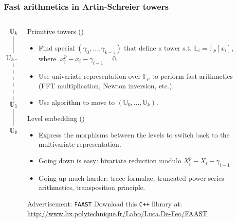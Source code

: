 \documentclass[10pt]{beamer}
\newcommand{\blue}[1]{\textcolor{blue}{#1}}  %
\newcommand{\LK}{\mathbb{L}}  %
\newcommand{\U}{\mathbb{U}}  %
\newcommand{\F}{\mathbb{F}}  %
\newcommand{\0}{\mathcal{O}}  %
\begin{document}
\begin{frame}
  \frametitle{Fast arithmetics in Artin-Schreier towers}

  \begin{columns}
    \begin{column}{0.1\textwidth}
      \Large\[\xymatrix{
        \U_k\ar@{-}[d]\\
        \U_{k-1} \ar@{--}[dd]\\
        \\
        \U_1 \ar@{-}[d]\\
        \U_0
      }\]
    \end{column}
    \begin{column}{0.85\textwidth}
      \vspace{-3mm}
      \begin{block}{Primitive towers (\cite{DFS10})}
        \begin{itemize}
        \item Find special $(\gamma_0,\ldots,\gamma_{k-1})$ that
          define a tower s.t. $\LK_i = \F_p[x_i]$, where
          $\;x_i^p-x_i-\gamma_{i-1}=0$.
        \item Use univariate representation over $\F_p$ to perform
          fast arithmetics (FFT multiplication, Newton inversion,
          etc.).
        \item Use \cite{Couveignes00} algorithm to move to
          $(\U_0,\ldots,\U_k)$.
        \end{itemize}
      \end{block}
      
      \vspace{-3mm}
      \begin{block}{Level embedding (\cite{DFS10})}
        \begin{itemize}
        \item Express the morphisms between the levels to switch back
          to the multivariate representation.
        \item Going down is easy: bivariate reduction modulo
          $X_i^p-X_i-\gamma_{i-1}$.
        \item Going up much harder: trace formulae, truncated power
          series arithmetics, transposition principle.
        \end{itemize}
      \end{block}

      \vspace{-3mm}
      \begin{block}{Advertisement: \texttt{FAAST}}
        Download this \texttt{C++} library at:
        \blue{\url{http://www.lix.polytechnique.fr/Labo/Luca.De-Feo/FAAST}}
      \end{block}
    \end{column}
  \end{columns}
\end{frame}
\end{document}
